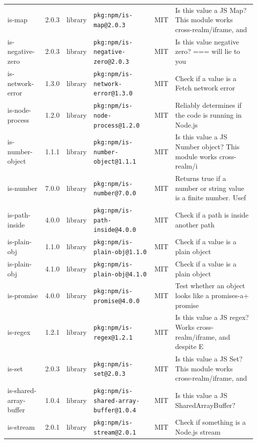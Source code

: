 \documentclass[11pt,a4paper]{article}
\begin{document}
\begin{longtable}{|p{4cm}|p{2cm}|p{1.6cm}|p{5cm}|p{1.5cm}|p{3.5cm}|}
\raggedright is-map & 2.0.3 & library & \small\texttt{pkg:npm/is-map@2.0.3} & MIT & \small Is this value a JS Map? This module works cross-realm/iframe, and \\
\raggedright is-negative-zero & 2.0.3 & library & \small\texttt{pkg:npm/is-negative-zero@2.0.3} & MIT & \small Is this value negative zero? === will lie to you \\
\raggedright is-network-error & 1.3.0 & library & \small\texttt{pkg:npm/is-network-error@1.3.0} & MIT & \small Check if a value is a Fetch network error \\
\raggedright is-node-process & 1.2.0 & library & \small\texttt{pkg:npm/is-node-process@1.2.0} & MIT & \small Reliably determines if the code is running in Node.js \\
\raggedright is-number-object & 1.1.1 & library & \small\texttt{pkg:npm/is-number-object@1.1.1} & MIT & \small Is this value a JS Number object? This module works cross-realm/i \\
\raggedright is-number & 7.0.0 & library & \small\texttt{pkg:npm/is-number@7.0.0} & MIT & \small Returns true if a number or string value is a finite number. Usef \\
\raggedright is-path-inside & 4.0.0 & library & \small\texttt{pkg:npm/is-path-inside@4.0.0} & MIT & \small Check if a path is inside another path \\
\raggedright is-plain-obj & 1.1.0 & library & \small\texttt{pkg:npm/is-plain-obj@1.1.0} & MIT & \small Check if a value is a plain object \\
\raggedright is-plain-obj & 4.1.0 & library & \small\texttt{pkg:npm/is-plain-obj@4.1.0} & MIT & \small Check if a value is a plain object \\
\raggedright is-promise & 4.0.0 & library & \small\texttt{pkg:npm/is-promise@4.0.0} & MIT & \small Test whether an object looks like a promises-a+ promise \\
\raggedright is-regex & 1.2.1 & library & \small\texttt{pkg:npm/is-regex@1.2.1} & MIT & \small Is this value a JS regex? Works cross-realm/iframe, and despite E \\
\raggedright is-set & 2.0.3 & library & \small\texttt{pkg:npm/is-set@2.0.3} & MIT & \small Is this value a JS Set? This module works cross-realm/iframe, and \\
\raggedright is-shared-array-buffer & 1.0.4 & library & \small\texttt{pkg:npm/is-shared-array-buffer@1.0.4} & MIT & \small Is this value a JS SharedArrayBuffer? \\
\raggedright is-stream & 2.0.1 & library & \small\texttt{pkg:npm/is-stream@2.0.1} & MIT & \small Check if something is a Node.js stream \\

\end{longtable}
\end{document}
